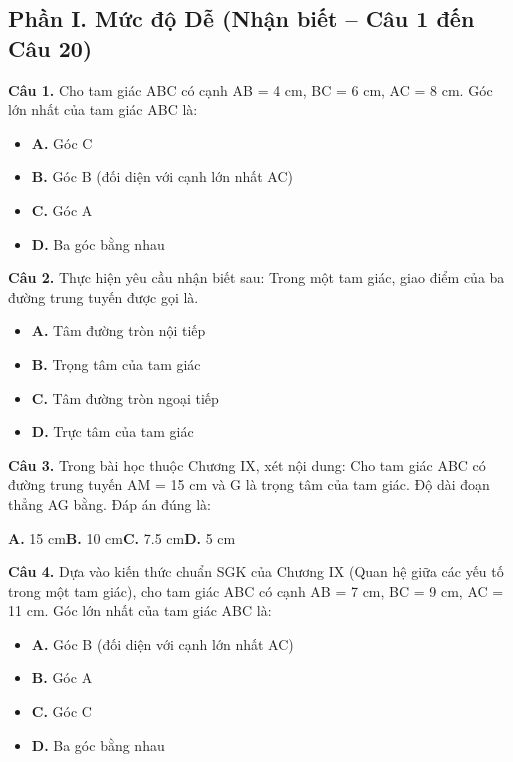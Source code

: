 \documentclass[11pt,a4paper]{article}
\begin{document}
\subsection*{\color{accent} Phần I. Mức độ Dễ (Nhận biết -- Câu 1 đến Câu 20)}
\textbf{\color{primary} Câu 1.} Cho tam giác ABC có cạnh AB = 4 cm, BC = 6 cm, AC = 8 cm. Góc lớn nhất của tam giác ABC là:\par
\begin{itemize}\setlength{\itemsep}{1pt}\setlength{\parskip}{0pt}
  \item[] \textbf{A.} Góc C
  \item[] \textbf{B.} Góc B (đối diện với cạnh lớn nhất AC)
  \item[] \textbf{C.} Góc A
  \item[] \textbf{D.} Ba góc bằng nhau
\end{itemize}\vspace{2pt}
\textbf{\color{primary} Câu 2.} Thực hiện yêu cầu nhận biết sau: Trong một tam giác, giao điểm của ba đường trung tuyến được gọi là.\par
\begin{itemize}\setlength{\itemsep}{1pt}\setlength{\parskip}{0pt}
  \item[] \textbf{A.} Tâm đường tròn nội tiếp
  \item[] \textbf{B.} Trọng tâm của tam giác
  \item[] \textbf{C.} Tâm đường tròn ngoại tiếp
  \item[] \textbf{D.} Trực tâm của tam giác
\end{itemize}\vspace{2pt}
\textbf{\color{primary} Câu 3.} Trong bài học thuộc Chương IX, xét nội dung: Cho tam giác ABC có đường trung tuyến AM = 15 cm và G là trọng tâm của tam giác. Độ dài đoạn thẳng AG bằng. Đáp án đúng là:\par
\hspace*{1.5em}\textbf{A.} 15 cm\quad\quad \textbf{B.} 10 cm\quad\quad \textbf{C.} 7.5 cm\quad\quad \textbf{D.} 5 cm\par\vspace{2pt}
\textbf{\color{primary} Câu 4.} Dựa vào kiến thức chuẩn SGK của Chương IX (Quan hệ giữa các yếu tố trong một tam giác), cho tam giác ABC có cạnh AB = 7 cm, BC = 9 cm, AC = 11 cm. Góc lớn nhất của tam giác ABC là:\par
\begin{itemize}\setlength{\itemsep}{1pt}\setlength{\parskip}{0pt}
  \item[] \textbf{A.} Góc B (đối diện với cạnh lớn nhất AC)
  \item[] \textbf{B.} Góc A
  \item[] \textbf{C.} Góc C
  \item[] \textbf{D.} Ba góc bằng nhau
\end{itemize}\vspace{2pt}
\end{document}
